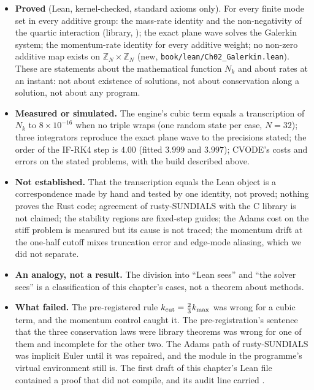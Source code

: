 \begin{honestbox}
\begin{itemize}
\item \textbf{Proved} (Lean, kernel-checked, standard axioms only). For every finite mode set in every additive group: the mass-rate identity and the non-negativity of the quartic interaction (library, ); the exact plane wave solves the
Galerkin system; the momentum-rate identity for every additive weight; no non-zero additive map exists on $\mathbb Z_N\times\mathbb Z_N$ (new, \texttt{book/lean/Ch02\_Galerkin.lean}). These are statements about the mathematical function $N_k$ and about rates at an instant: not about existence of solutions,
not about conservation along a solution, not about any program.
\item \textbf{Measured or simulated.} The engine's cubic term equals a transcription of $N_k$ to $8\times10^{-16}$ when no triple wraps (one random state per case, $N=32$); three integrators reproduce the exact plane wave to the precisions stated; the order of the IF-RK4 step is $4.00$ (fitted $3.999$ and $3.997$);
CVODE's costs and errors on the stated problems, with the build described above.
\item \textbf{Not established.} That the transcription equals the Lean object is a correspondence made by hand and tested by one identity, not proved; nothing proves the Rust code; agreement of rusty-SUNDIALS with the C library is not claimed; the stability regions are fixed-step guides; the Adams cost on the stiff problem is
measured but its cause is not traced; the momentum drift at the one-half cutoff mixes truncation error and edge-mode aliasing, which we did not separate.
\item \textbf{An analogy, not a result.} The division into ``Lean sees'' and ``the solver sees'' is a classification of this chapter's cases, not a theorem about methods.
\item \textbf{What failed.} The pre-registered rule $k_{\rm cut}=\frac23k_{\max}$ was wrong for a cubic term, and the momentum control caught it. The pre-registration's sentence that the three conservation laws were library theorems was wrong for one of them and incomplete for the other two.
The Adams path of rusty-SUNDIALS was implicit Euler until it was repaired, and the module in the programme's virtual environment still is. The first draft of this chapter's Lean file contained a proof that did not compile, and its audit line carried .
\end{itemize}
\end{honestbox}


